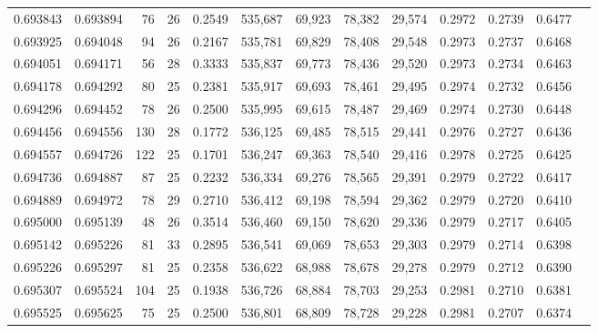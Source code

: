 \begin{tabular}{rrrrrrrrrrrrr}
0.693843 & 0.693894 &    76 &  26 &                                     0.2549 & 535,687 &  69,923 &  78,382 &  29,574 & 0.2972 & 0.2739 & 0.6477 \\
0.693925 & 0.694048 &    94 &  26 &                                     0.2167 & 535,781 &  69,829 &  78,408 &  29,548 & 0.2973 & 0.2737 & 0.6468 \\
0.694051 & 0.694171 &    56 &  28 &                                     0.3333 & 535,837 &  69,773 &  78,436 &  29,520 & 0.2973 & 0.2734 & 0.6463 \\
0.694178 & 0.694292 &    80 &  25 &                                     0.2381 & 535,917 &  69,693 &  78,461 &  29,495 & 0.2974 & 0.2732 & 0.6456 \\
0.694296 & 0.694452 &    78 &  26 &                                     0.2500 & 535,995 &  69,615 &  78,487 &  29,469 & 0.2974 & 0.2730 & 0.6448 \\
0.694456 & 0.694556 &   130 &  28 &                                     0.1772 & 536,125 &  69,485 &  78,515 &  29,441 & 0.2976 & 0.2727 & 0.6436 \\
0.694557 & 0.694726 &   122 &  25 &                                     0.1701 & 536,247 &  69,363 &  78,540 &  29,416 & 0.2978 & 0.2725 & 0.6425 \\
0.694736 & 0.694887 &    87 &  25 &                                     0.2232 & 536,334 &  69,276 &  78,565 &  29,391 & 0.2979 & 0.2722 & 0.6417 \\
0.694889 & 0.694972 &    78 &  29 &                                     0.2710 & 536,412 &  69,198 &  78,594 &  29,362 & 0.2979 & 0.2720 & 0.6410 \\
0.695000 & 0.695139 &    48 &  26 &                                     0.3514 & 536,460 &  69,150 &  78,620 &  29,336 & 0.2979 & 0.2717 & 0.6405 \\
0.695142 & 0.695226 &    81 &  33 &                                     0.2895 & 536,541 &  69,069 &  78,653 &  29,303 & 0.2979 & 0.2714 & 0.6398 \\
0.695226 & 0.695297 &    81 &  25 &                                     0.2358 & 536,622 &  68,988 &  78,678 &  29,278 & 0.2979 & 0.2712 & 0.6390 \\
0.695307 & 0.695524 &   104 &  25 &                                     0.1938 & 536,726 &  68,884 &  78,703 &  29,253 & 0.2981 & 0.2710 & 0.6381 \\
0.695525 & 0.695625 &    75 &  25 &                                     0.2500 & 536,801 &  68,809 &  78,728 &  29,228 & 0.2981 & 0.2707 & 0.6374 \\

\end{tabular}
